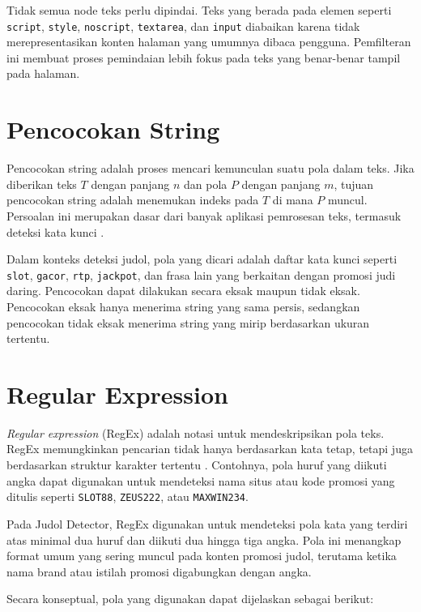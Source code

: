 Tidak semua node teks perlu dipindai. Teks yang berada pada elemen seperti
\texttt{script}, \texttt{style}, \texttt{noscript}, \texttt{textarea}, dan
\texttt{input} diabaikan karena tidak merepresentasikan konten halaman yang
umumnya dibaca pengguna. Pemfilteran ini membuat proses pemindaian lebih fokus
pada teks yang benar-benar tampil pada halaman.

\section{Pencocokan String}

Pencocokan string adalah proses mencari kemunculan suatu pola dalam teks.
Jika diberikan teks $T$ dengan panjang $n$ dan pola $P$ dengan panjang $m$,
tujuan pencocokan string adalah menemukan indeks pada $T$ di mana $P$ muncul.
Persoalan ini merupakan dasar dari banyak aplikasi pemrosesan teks, termasuk
deteksi kata kunci \cite{cormen2009introduction}.

Dalam konteks deteksi judol, pola yang dicari adalah daftar kata kunci seperti
\texttt{slot}, \texttt{gacor}, \texttt{rtp}, \texttt{jackpot}, dan frasa lain
yang berkaitan dengan promosi judi daring. Pencocokan dapat dilakukan secara
eksak maupun tidak eksak. Pencocokan eksak hanya menerima string yang sama
persis, sedangkan pencocokan tidak eksak menerima string yang mirip berdasarkan
ukuran tertentu.

\section{Regular Expression}

\textit{Regular expression} (RegEx) adalah notasi untuk mendeskripsikan pola
teks. RegEx memungkinkan pencarian tidak hanya berdasarkan kata tetap, tetapi
juga berdasarkan struktur karakter tertentu \cite{friedl2006regex}. Contohnya,
pola huruf yang diikuti angka dapat digunakan untuk mendeteksi nama situs atau
kode promosi yang ditulis seperti \texttt{SLOT88}, \texttt{ZEUS222}, atau
\texttt{MAXWIN234}.

Pada Judol Detector, RegEx digunakan untuk mendeteksi pola kata yang terdiri
atas minimal dua huruf dan diikuti dua hingga tiga angka. Pola ini menangkap
format umum yang sering muncul pada konten promosi judol, terutama ketika nama
brand atau istilah promosi digabungkan dengan angka.

Secara konseptual, pola yang digunakan dapat dijelaskan sebagai berikut:

